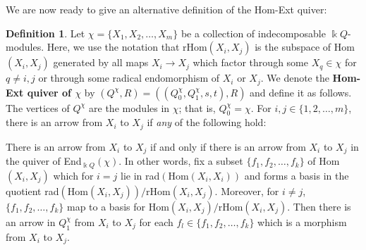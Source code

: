 \documentclass[12pt]{amsart}
\theoremstyle{plain}
\theoremstyle{definition}
\newtheorem{defn}{Definition}[section]
\theoremstyle{remark}
\begin{document}
We are now ready to give an alternative definition of the Hom-Ext quiver:

\begin{defn}\label{defn: Hom-Ext quiver in repQ}
Let $\chi = \{X_1, X_2, \dots, X_m\}$ be a collection of {\color{black} indecomposable} $\Bbbk Q$-modules. Here, we use the notation that rHom$(X_i,X_j)$ is the subspace of Hom$(X_i,X_j)$ generated by all maps $X_i\to X_j$ which factor through some {\color{black} $X_q \in \chi$} for $q\neq i,j$ {\color{black} or through some radical endomorphism of $X_i$ or $X_j$}. We denote the \textbf{Hom-Ext quiver of $\chi$} by $(Q^{\chi},R) = ((Q_0^{\chi},Q_1^{\chi},s,t),R)$ and define it as follows. \\


The vertices of $Q^{\chi}$ are the modules in $\chi$; that is, $Q_0^{\chi} = \chi$. For $i,j \in \{1,2,\dots, m\}$, there is an arrow from $X_i$ to $X_j$ if \textit{any} of the following hold:


\begin{enumerate}


{\color{black}
\item There is an arrow from $X_i$ to $X_j$ if and only if there is an arrow from $X_i$ to $X_j$ in the quiver of End$_{\Bbbk Q}(\chi)$. In other words, fix a subset $\{f_1, f_2, \dots, f_k\}$ of Hom$(X_i,X_j)$ which {\color{black}for $i=j$ lie in rad$(\text{Hom}(X_i,X_i))$ and forms a basis in the quotient rad$(\text{Hom}(X_i,X_j))/\text{rHom}(X_i,X_j)$. {\color{black} Moreover,} for $i\neq j$, $\{f_1, f_2, \dots, f_k\}$ map to a basis for Hom$(X_i,X_j)/\text{rHom}(X_i,X_j)$}. Then there is an arrow in $Q_1^{\chi}$ from $X_i$ to $X_j$ for each $f_l \in \{f_1,f_2, \dots, f_k\}$ which is a morphism from $X_i$ to $X_j$. 

}
\end{enumerate}
\end{defn}
\end{document}

